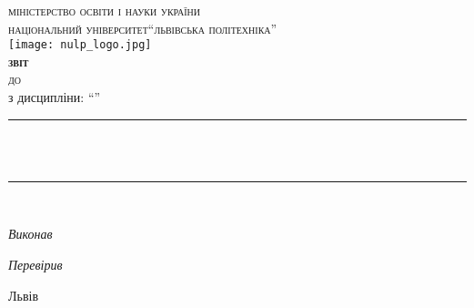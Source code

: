 \newcommand{\LINE}{\rule{\linewidth}{0.4mm}}	
\begin{titlepage} 	
	\center 
	
	\textsc{міністерство освіти і науки україни}\\
	\textsc{національний університет"`львівська політехніка"'}\\
	[1.5cm]

	\texttt{[image: nulp\_logo.jpg]}\\[1.5cm]

	\textsc{\LARGE\bfseries звіт}\\	
	\textsc{ до \Type \, \Number}\\ 
  з дисципліни: "`\Subject"'\\
	
	\LINE\\[0.2cm]
	\large
	\textsc{\bfseries \Theme}\\[0cm] 
	\normalsize
	\LINE\\[1cm]


	\begin{flushright}
		\large
		\textit{Виконав}\\
		\normalsize
		\Class \; \textsc{\Author} 

		\large
		\textit{Перевірив}\\
		\normalsize
		\Position \; \textsc{\Teacher}
	\end{flushright}

	\vfill
	Львів	\the\year{}
\end{titlepage}
\Margins
